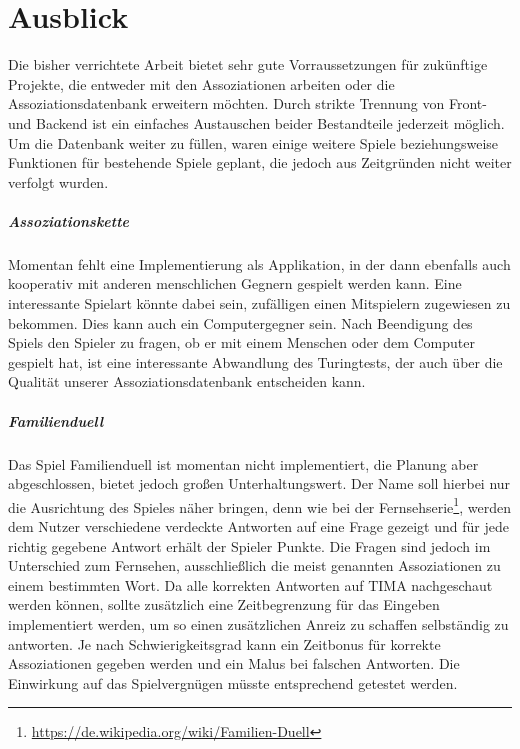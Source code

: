 \chapter{Ausblick}\label{ch:ausblick}

Die bisher verrichtete Arbeit bietet sehr gute Vorraussetzungen für zukünftige Projekte, die entweder mit den Assoziationen arbeiten oder die Assoziationsdatenbank erweitern möchten. Durch strikte Trennung von Front- und Backend ist ein einfaches Austauschen beider Bestandteile jederzeit möglich.
Um die Datenbank weiter zu füllen, waren einige weitere Spiele beziehungsweise Funktionen für bestehende Spiele geplant, die jedoch aus Zeitgründen nicht weiter verfolgt wurden.

\paragraph{Assoziationskette}
Momentan fehlt eine Implementierung als Applikation, in der dann ebenfalls auch kooperativ mit anderen menschlichen Gegnern gespielt werden kann. Eine interessante Spielart könnte dabei sein, zufälligen einen Mitspielern zugewiesen zu bekommen. Dies kann auch ein Computergegner sein. Nach Beendigung des Spiels den Spieler zu fragen, ob er mit einem Menschen oder dem Computer gespielt hat, ist eine interessante Abwandlung des Turingtests, der auch über die Qualität unserer Assoziationsdatenbank entscheiden kann.

\paragraph{Familienduell}
Das Spiel Familienduell ist momentan nicht implementiert, die Planung aber abgeschlossen, bietet jedoch großen Unterhaltungswert. Der Name soll hierbei nur die Ausrichtung des Spieles näher bringen,
denn wie bei der
Fernsehserie\footnote{\url{https://de.wikipedia.org/wiki/Familien-Duell}},
werden dem Nutzer verschiedene verdeckte Antworten auf eine Frage gezeigt
und für jede richtig gegebene Antwort erhält der Spieler Punkte.
Die Fragen sind jedoch im Unterschied zum Fernsehen, ausschließlich die meist
genannten Assoziationen zu einem bestimmten Wort. Da alle korrekten Antworten auf TIMA nachgeschaut werden können, sollte zusätzlich eine
Zeitbegrenzung für das Eingeben implementiert werden, um so einen zusätzlichen Anreiz zu schaffen selbständig zu antworten. Je nach Schwierigkeitsgrad kann ein Zeitbonus für korrekte Assoziationen
gegeben werden und ein Malus bei falschen Antworten. Die Einwirkung auf das
Spielvergnügen müsste entsprechend getestet werden.

